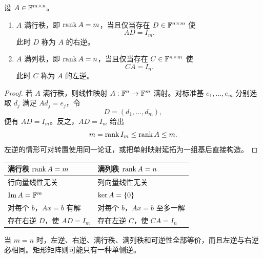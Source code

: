 \begin{theorem}
设 $A\in\mathbb F^{m\times n}$。
\begin{enumerate}
  \item $A$ 满行秩，即 $\operatorname{rank} A=m$，当且仅当存在 $D\in\mathbb F^{n\times m}$ 使
  \begin{equation}
   AD=I_m.
  \end{equation}
  此时 $D$ 称为 $A$ 的右逆。
  \item $A$ 满列秩，即 $\operatorname{rank} A=n$，当且仅当存在 $C\in\mathbb F^{n\times m}$ 使
  \begin{equation}
   CA=I_n.
  \end{equation}
  此时 $C$ 称为 $A$ 的左逆。
\end{enumerate}
\end{theorem}

\begin{proof}
若 $A$ 满行秩，则线性映射 $A:\mathbb F^n\to\mathbb F^m$ 满射。对标准基 $e_1,\ldots,e_m$ 分别选取 $d_j$ 满足 $Ad_j=e_j$，令
\begin{equation}
 D=(d_1,\ldots,d_m),
\end{equation}
便有 $AD=I_m$。反之，$AD=I_m$ 给出
\begin{equation}
 m=\operatorname{rank} I_m\leq\operatorname{rank} A\leq m.
\end{equation}
左逆的情形可对转置使用同一论证，或把单射映射延拓为一组基后直接构造。
\end{proof}

\begin{center}
\begin{tabular}{p{}p{}}
\toprule
满行秩 $\operatorname{rank} A=m$ & 满列秩 $\operatorname{rank} A=n$\\
\midrule
行向量线性无关 & 列向量线性无关\\
$\operatorname{Im} A=\mathbb F^m$ & $\operatorname{ker} A=\{0\}$\\
对每个 $b$，$Ax=b$ 有解 & 对每个 $b$，$Ax=b$ 至多一解\\
存在右逆 $D$，使 $AD=I_m$ & 存在左逆 $C$，使 $CA=I_n$\\
\bottomrule
\end{tabular}
\end{center}

\begin{remark}
当 $m=n$ 时，左逆、右逆、满行秩、满列秩和可逆性全部等价，而且左逆与右逆必相同。矩形矩阵则可能只有一种单侧逆。
\end{remark}
